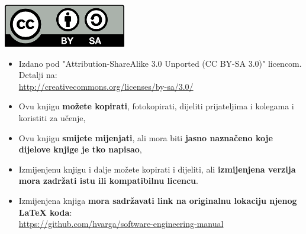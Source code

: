 \begin{center}
    \includegraphics{images/by-sa}
\end{center}

\begin{itemize}
    \item Izdano pod "Attribution-ShareAlike 3.0 Unported (CC BY-SA 3.0)" licencom. Detalji na: \\ \url{http://creativecommons.org/licenses/by-sa/3.0/}
    \item Ovu knjigu \textbf{možete kopirati}, fotokopirati, dijeliti prijateljima i kolegama i koristiti za učenje,
    \item Ovu knjigu \textbf{smijete mijenjati}, ali mora biti \textbf{jasno naznačeno koje dijelove knjige je tko napisao},
    \item Izmijenjenu knjigu i dalje možete kopirati i dijeliti, ali \textbf{izmijenjena verzija mora zadržati istu ili kompatibilnu licencu}.
    \item Izmijenjena knjiga \textbf{mora sadržavati link na originalnu lokaciju njenog \LaTeX{} koda}: \\ \url{https://github.com/hvarga/software-engineering-manual}
\end{itemize}